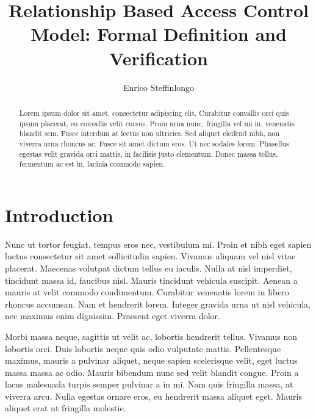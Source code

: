 \documentclass[10pt]{llncs}
\author{Enrico Steffinlongo}
\institute{Universit\`{a} Ca' Foscari Venezia}
\title{Relationship Based Access Control Model: Formal Definition and Verification}
\begin{document}
\maketitle

\begin{abstract}
Lorem ipsum dolor sit amet, consectetur adipiscing elit. Curabitur convallis orci quis ipsum placerat, eu convallis velit cursus. Proin urna nunc, fringilla vel mi in, venenatis blandit sem. Fusce interdum at lectus non ultricies. Sed aliquet eleifend nibh, non viverra urna rhoncus ac. Fusce sit amet dictum eros. Ut nec sodales lorem. Phasellus egestas velit gravida orci mattis, in facilisis justo elementum. Donec massa tellus, fermentum ac est in, lacinia commodo sapien.
\end{abstract}

\section{Introduction}
\begin{comment}
\end{comment}

Nunc ut tortor feugiat, tempus eros nec, vestibulum mi. Proin et nibh eget sapien luctus consectetur sit amet sollicitudin sapien. Vivamus aliquam vel nisl vitae placerat. Maecenas volutpat dictum tellus eu iaculis. Nulla at nisl imperdiet, tincidunt massa id, faucibus nisl. Mauris tincidunt vehicula suscipit. Aenean a mauris at velit commodo condimentum. Curabitur venenatis lorem in libero rhoncus accumsan. Nam et hendrerit lorem. Integer gravida urna ut nisl vehicula, nec maximus enim dignissim. Praesent eget viverra dolor.

Morbi massa neque, sagittis ut velit ac, lobortis hendrerit tellus. Vivamus non lobortis orci. Duis lobortis neque quis odio vulputate mattis. Pellentesque maximus, mauris a pulvinar aliquet, neque sapien scelerisque velit, eget luctus massa massa ac odio. Mauris bibendum nunc sed velit blandit congue. Proin a lacus malesuada turpis semper pulvinar a in mi. Nam quis fringilla massa, at viverra arcu. Nulla egestas ornare eros, eu hendrerit massa aliquet eget. Mauris aliquet erat ut fringilla molestie.
\end{document}
